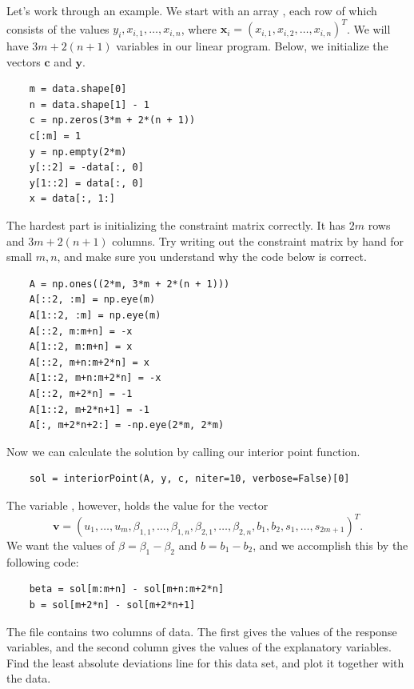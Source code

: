 Let's work through an example. We start with an array , each row of which consists of the values $y_i, x_{i,1},\ldots,x_{i,n}$,
where $\mathbf{x}_i = (x_{i,1}, x_{i,2}, \ldots, x_{i,n})^T$. We will have $3m + 2(n+1)$ variables in our linear program. Below, we initialize
the vectors $\mathbf{c}$ and $\mathbf{y}$.
\begin{lstlisting}
    m = data.shape[0]
    n = data.shape[1] - 1
    c = np.zeros(3*m + 2*(n + 1))
    c[:m] = 1
    y = np.empty(2*m)
    y[::2] = -data[:, 0]
    y[1::2] = data[:, 0]
    x = data[:, 1:]
\end{lstlisting}

The hardest part is initializing the constraint matrix correctly. It has $2m$ rows and $3m + 2(n+1)$ columns. Try writing out the
constraint matrix by hand for small $m, n$, and make sure you understand why the code below is correct.
\begin{lstlisting}
    A = np.ones((2*m, 3*m + 2*(n + 1)))
    A[::2, :m] = np.eye(m)
    A[1::2, :m] = np.eye(m)
    A[::2, m:m+n] = -x
    A[1::2, m:m+n] = x
    A[::2, m+n:m+2*n] = x
    A[1::2, m+n:m+2*n] = -x
    A[::2, m+2*n] = -1
    A[1::2, m+2*n+1] = -1
    A[:, m+2*n+2:] = -np.eye(2*m, 2*m)
\end{lstlisting}

Now we can calculate the solution by calling our interior point function.
\begin{lstlisting}
    sol = interiorPoint(A, y, c, niter=10, verbose=False)[0]
\end{lstlisting}

The variable , however, holds the value for the vector
\[
\mathbf{v} = (u_1,\ldots, u_m, \beta_{1,1},\ldots, \beta_{1,n}, \beta_{2,1},\ldots, \beta_{2,n}, b_1, b_2, s_1,\ldots,s_{2m+1})^T.
\]
We want the values of $\beta = \beta_1-\beta_2$ and $b = b_1 - b_2$, and we accomplish this by the
following code:
\begin{lstlisting}
    beta = sol[m:m+n] - sol[m+n:m+2*n]
    b = sol[m+2*n] - sol[m+2*n+1]
\end{lstlisting}

\begin{problem}
The file  contains two columns of data. The first gives the values of the response
variables, and the second column gives the values of the explanatory variables. Find the least absolute
deviations line for this data set, and plot it together with the data.
\end{problem} 